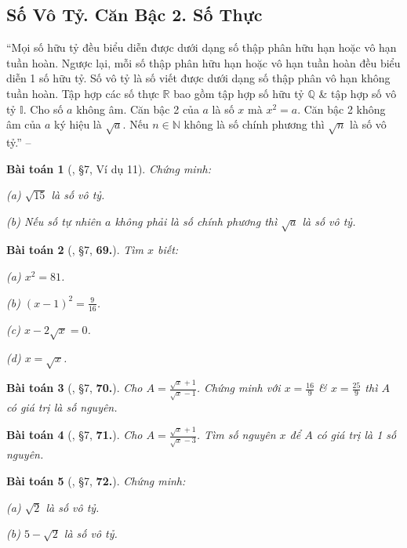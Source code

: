 \documentclass{article}
\numberwithin{equation}{section}
\newtheorem{baitoan}{Bài toán}[section]
\begin{document}
\subsection{Số Vô Tỷ. Căn Bậc 2. Số Thực}
``Mọi số hữu tỷ đều biểu diễn được dưới dạng số thập phân hữu hạn hoặc vô hạn tuần hoàn. Ngược lại, mỗi số thập phân hữu hạn hoặc vô hạn tuần hoàn đều biểu diễn 1 số hữu tỷ. Số vô tỷ là số viết được dưới dạng số thập phân vô hạn không tuần hoàn. Tập hợp các số thực $\mathbb{R}$ bao gồm tập hợp số hữu tỷ $\mathbb{Q}$ \& tập hợp số vô tỷ $\mathbb{I}$. Cho số $a$ không âm. Căn bậc 2 của $a$ là số $x$ mà $x^2 = a$. Căn bậc 2 không âm của $a$ ký hiệu là $\sqrt{a}$. Nếu $n\in\mathbb{N}$ không là số chính phương thì $\sqrt{n}$ là số vô tỷ.'' -- \cite[\S7]{Binh_Toan_7_tap_1}

\begin{baitoan}[\cite{Binh_Toan_7_tap_1}, \S7, Ví dụ 11]
	Chứng minh:
	\begin{enumerate*}
		\item[(a)] $\sqrt{15}$ là số vô tỷ.
		\item[(b)] Nếu số tự nhiên $a$ không phải là số chính phương thì $\sqrt{a}$ là số vô tỷ.
	\end{enumerate*}
\end{baitoan}

\begin{baitoan}[\cite{Binh_Toan_7_tap_1}, \S7, \textbf{69.}]
	Tìm $x$ biết:
	\begin{enumerate*}
		\item[(a)] $x^2 = 81$.
		\item[(b)] $(x - 1)^2 = \frac{9}{16}$.
		\item[(c)] $x - 2\sqrt{x} = 0$.
		\item[(d)] $x = \sqrt{x}$.
	\end{enumerate*}
\end{baitoan}

\begin{baitoan}[\cite{Binh_Toan_7_tap_1}, \S7, \textbf{70.}]
	Cho $A = \frac{\sqrt{x} + 1}{\sqrt{x} - 1}$. Chứng minh với $x = \frac{16}{9}$ \& $x = \frac{25}{9}$ thì $A$ có giá trị là số nguyên.
\end{baitoan}

\begin{baitoan}[\cite{Binh_Toan_7_tap_1}, \S7, \textbf{71.}]
	Cho $A = \frac{\sqrt{x} + 1}{\sqrt{x} - 3}$. Tìm số nguyên $x$ để $A$ có giá trị là 1 số nguyên.
\end{baitoan}

\begin{baitoan}[\cite{Binh_Toan_7_tap_1}, \S7, \textbf{72.}]
	Chứng minh:
	\begin{enumerate*}
		\item[(a)] $\sqrt{2}$ là số vô tỷ.
		\item[(b)] $5 - \sqrt{2}$ là số vô tỷ.
	\end{enumerate*}
\end{baitoan}
\end{document}
